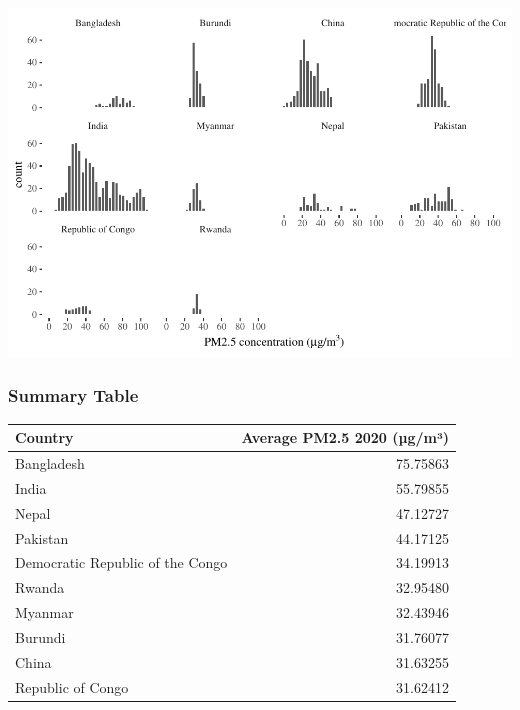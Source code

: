 \documentclass[
]{article}
\begin{document}
\includegraphics[width=1\linewidth]{man/figures/README-pm2.5_country_dist_aqli_plot-1}

\hypertarget{summary-table}{%
\subsubsection{Summary Table}\label{summary-table}}

\begin{longtable}[]{@{}lr@{}}
\toprule
Country & Average PM2.5 2020 (µg/m³) \\
\midrule
\endhead
Bangladesh & 75.75863 \\
India & 55.79855 \\
Nepal & 47.12727 \\
Pakistan & 44.17125 \\
Democratic Republic of the Congo & 34.19913 \\
Rwanda & 32.95480 \\
Myanmar & 32.43946 \\
Burundi & 31.76077 \\
China & 31.63255 \\
Republic of Congo & 31.62412 \\
\bottomrule
\end{longtable}
\end{document}
